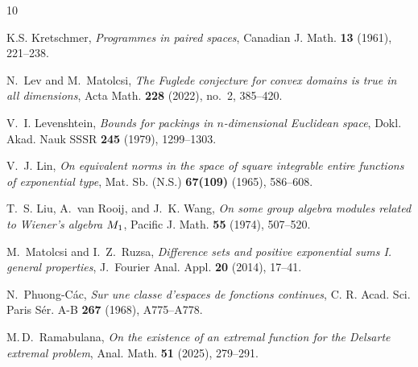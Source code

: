 \documentclass[[a4paper,english,12pt]{amsart}
\theoremstyle{plain}
\theoremstyle{remark}
\begin{document}
\begin{thebibliography}{10}


K.S. Kretschmer, \emph{Programmes in paired spaces}, Canadian J. Math.
  \textbf{13} (1961), 221--238.

N.~Lev and M.~Matolcsi, \emph{The {F}uglede conjecture for convex domains is
  true in all dimensions}, Acta Math. \textbf{228} (2022), no.~2, 385--420.

V.~I. Levenshtein, \emph{Bounds for packings in $n$-dimensional {E}uclidean
  space}, Dokl. Akad. Nauk SSSR \textbf{245} (1979), 1299--1303.



V.~J. Lin, \emph{On equivalent norms in the space of square integrable entire
  functions of exponential type}, Mat. Sb. (N.S.) \textbf{67(109)} (1965),
  586--608.

T.~S. Liu, A.~van Rooij, and J.~K. Wang, \emph{On some group algebra modules
  related to {W}iener's algebra {$M\sb{1}$}}, Pacific J. Math. \textbf{55}
  (1974), 507--520.

M.~Matolcsi and I.~Z.~Ruzsa, \emph{Difference sets and positive exponential sums
  {I}. general properties}, J.~Fourier Anal. Appl. \textbf{20} (2014), 17--41.


N.~Phuong-C\'ac, \emph{Sur une classe d'espaces de fonctions continues}, C. R.
  Acad. Sci. Paris S\'er. A-B \textbf{267} (1968), A775--A778.


M.\,D.~Ramabulana,
\emph{On the existence of an extremal function for the Delsarte extremal problem},
Anal. Math. \textbf{51} (2025), 279--291.


\end{thebibliography}
\end{document}

